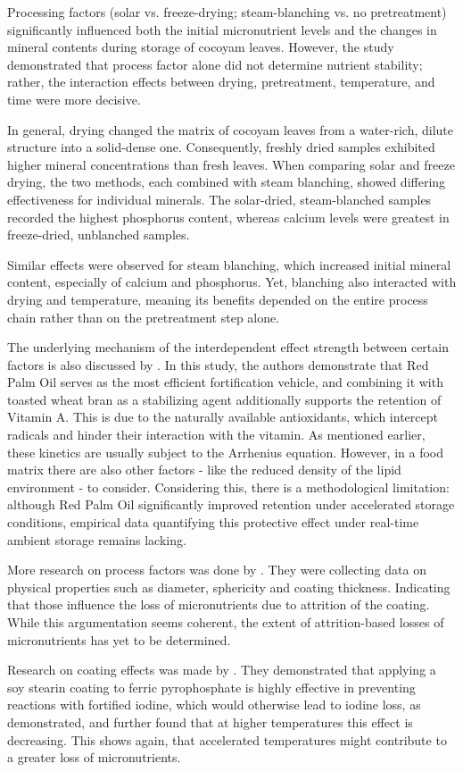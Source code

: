 Processing factors (solar vs. freeze-drying; steam-blanching vs. no pretreatment) significantly influenced both the initial micronutrient levels and the changes in mineral contents during storage of cocoyam leaves. However, the study demonstrated that process factor alone did not determine nutrient stability; rather, the interaction effects between drying, pretreatment, temperature, and time were more decisive. \par
In general, drying changed the matrix of cocoyam leaves from a water-rich, dilute structure into a solid-dense one. Consequently, freshly dried samples exhibited higher mineral concentrations than fresh leaves. When comparing solar and freeze drying, the two methods, each combined with steam blanching, showed differing effectiveness for individual minerals. The solar-dried, steam-blanched samples recorded the highest phosphorus content, whereas calcium levels were greatest in freeze-dried, unblanched samples.  \par
Similar effects were observed for steam blanching, which increased initial mineral content, especially of calcium and phosphorus. Yet, blanching also interacted with drying and temperature, meaning its benefits depended on the entire process chain rather than on the pretreatment step alone.
\par 
The underlying mechanism of the interdependent effect strength between certain factors is also discussed by \citet{gari}. In this study, the authors demonstrate that Red Palm Oil serves as the most efficient fortification vehicle, and combining it with toasted wheat bran as a stabilizing agent additionally supports the retention of Vitamin A. This is due to the naturally available antioxidants, which intercept radicals and hinder their interaction with the vitamin. As mentioned earlier, these kinetics are usually subject to the Arrhenius equation. However, in a food matrix there are also other factors - like the reduced density of the lipid environment - to consider. Considering this, there is a methodological limitation: although Red Palm Oil significantly improved retention under accelerated storage conditions, empirical data quantifying this protective effect under real-time ambient storage remains lacking. 
\par
More research on process factors was done by \citet{li2coatsalt}. They were collecting data on physical properties such as diameter, sphericity and coating thickness. Indicating that those influence the loss of micronutrients due to attrition of the coating. While this argumentation seems coherent, the extent of attrition-based losses of micronutrients has yet to be determined. 
\par
Research on coating effects was made by \citet{li3capsalt}. They demonstrated that applying a soy stearin coating to ferric pyrophosphate is highly effective in preventing reactions with fortified iodine, which would otherwise lead to iodine loss, as \citet{wegmueller} demonstrated, and further found that at higher temperatures this effect is decreasing. This shows again, that accelerated temperatures might contribute to a greater loss of micronutrients. 
